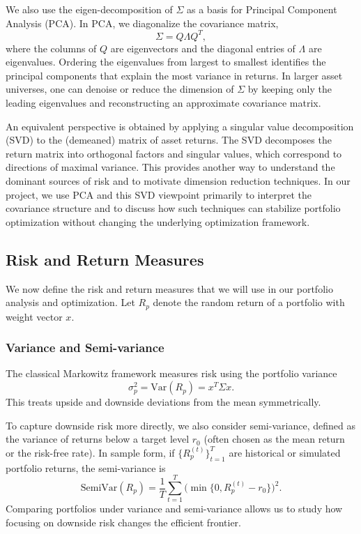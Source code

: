\documentclass[12pt]{article}
\begin{document}
We also use the eigen-decomposition of $\Sigma$ as a basis for Principal Component Analysis (PCA). In PCA, we diagonalize the covariance matrix,
\begin{equation}
    \Sigma = Q \Lambda Q^{T},
\end{equation}
where the columns of $Q$ are eigenvectors and the diagonal entries of $\Lambda$ are eigenvalues. Ordering the eigenvalues from largest to smallest identifies the principal components that explain the most variance in returns. In larger asset universes, one can denoise or reduce the dimension of $\Sigma$ by keeping only the leading eigenvalues and reconstructing an approximate covariance matrix.

An equivalent perspective is obtained by applying a singular value decomposition (SVD) to the (demeaned) matrix of asset returns. The SVD decomposes the return matrix into orthogonal factors and singular values, which correspond to directions of maximal variance. This provides another way to understand the dominant sources of risk and to motivate dimension reduction techniques. In our project, we use PCA and this SVD viewpoint primarily to interpret the covariance structure and to discuss how such techniques can stabilize portfolio optimization without changing the underlying optimization framework.



\subsection{Risk and Return Measures}

We now define the risk and return measures that we will use in our portfolio analysis and optimization. Let $R_p$ denote the random return of a portfolio with weight vector $x$.

\subsubsection{Variance and Semi-variance}

The classical Markowitz framework measures risk using the portfolio variance
\begin{equation}
    \sigma_{p}^{2} = \mathrm{Var}(R_p) = x^{T} \Sigma x.
\end{equation}
This treats upside and downside deviations from the mean symmetrically.

To capture downside risk more directly, we also consider semi-variance, defined as the variance of returns below a target level $r_0$ (often chosen as the mean return or the risk-free rate). In sample form, if $\{R_p^{(t)}\}_{t=1}^{T}$ are historical or simulated portfolio returns, the semi-variance is
\begin{equation}
    \mathrm{SemiVar}(R_p)
    = \frac{1}{T} \sum_{t=1}^{T}
        \big( \min\{0, R_p^{(t)} - r_0\} \big)^{2}.
\end{equation}
Comparing portfolios under variance and semi-variance allows us to study how focusing on downside risk changes the efficient frontier.
\end{document}
